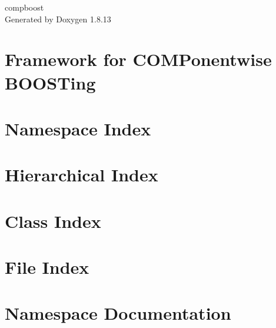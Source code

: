\documentclass[twoside]{book}
\newcommand{\+}{\discretionary{\mbox{\scriptsize$\hookleftarrow$}}{}{}}
\newcommand{\clearemptydoublepage}{%
  \newpage{\pagestyle{empty}\cleardoublepage}%
}
\begin{document}
\hypersetup{pageanchor=false,
             bookmarksnumbered=true,
             pdfencoding=unicode
            }
\begin{titlepage}
\vspace*{7cm}
\begin{center}%
{\Large compboost }\\
\vspace*{1cm}
{\large Generated by Doxygen 1.8.13}\\
\end{center}
\end{titlepage}
\clearemptydoublepage
{}
\tableofcontents
\clearemptydoublepage
{}
\hypersetup{pageanchor=true}

\chapter{Framework for C\+O\+M\+Ponentwise B\+O\+O\+S\+Ting}
\label{index}\hypertarget{index}{}
\chapter{Namespace Index}

\chapter{Hierarchical Index}

\chapter{Class Index}

\chapter{File Index}

\chapter{Namespace Documentation}










\end{document}
